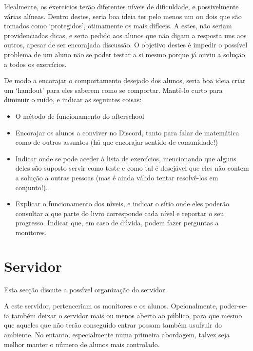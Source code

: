 \documentclass{article}
\begin{document}
	Idealmente, os exercícios terão diferentes níveis de dificuldade, e possivelmente várias alíneas. Dentro destes, seria boa ideia ter pelo menos um ou dois que são tomados como `protegidos', otimamente os mais difíceis. A estes, não seriam providenciadas dicas, e seria pedido aos alunos que não digam a resposta uns aos outros, apesar de ser encorajada discussão. O objetivo destes é impedir o possível problema de um aluno não se poder testar a si mesmo porque já ouviu a solução a todos os exercícios.
	
	De modo a encorajar o comportamento desejado dos alunos, seria boa ideia criar um `handout' para eles saberem como se comportar. Mantê-lo curto para diminuir o ruído, e indicar as seguintes coisas:
	
	\begin{itemize}
	\item O método de funcionamento do afterschool
	
	\item Encorajar os alunos a conviver no Discord, tanto para falar de matemática como de outros assuntos (há-que encorajar sentido de comunidade!)
	
	\item Indicar onde se pode aceder à lista de exercícios, mencionando que alguns deles são suposto servir como teste e como tal é desejável que eles não contem a solução a outras pessoas (mas é ainda válido tentar resolvê-los em conjunto!).
	
	\item Explicar o funcionamento dos níveis, e indicar o sítio onde eles poderão consultar a que parte do livro corresponde cada nível e reportar o seu progresso. Indicar que, em caso de dúvida, podem fazer perguntas a monitores.
	\end{itemize}

	\section{Servidor}

	Esta secção discute a possível organização do servidor.

	A este servidor, pertenceriam os monitores e os alunos. Opcionalmente, poder-se-ia também deixar o servidor mais ou menos aberto ao público, para que mesmo que aqueles que não terão conseguido entrar possam também usufruir do ambiente. No entanto, especialmente numa primeira abordagem, talvez seja melhor manter o número de alunos mais controlado.
\end{document}
